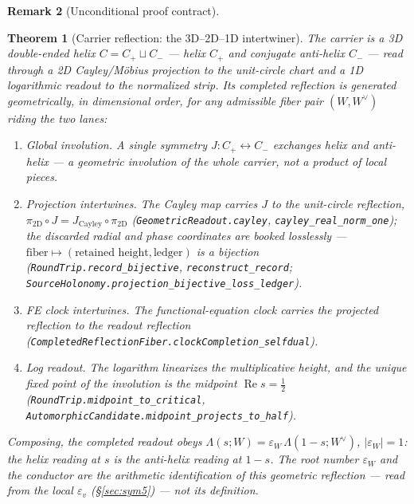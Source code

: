 \documentclass[11pt]{article}
\newtheorem{theorem}{Theorem}
\theoremstyle{definition}
\newtheorem{remark}[theorem]{Remark}
\renewcommand{\Re}{\operatorname{Re}}
\begin{document}
\begin{remark}[Unconditional proof contract]
\begin{enumerate}
\begin{theorem}[Carrier reflection: the 3D--2D--1D intertwiner]\label{thm:carrierreflection}
The carrier is a 3D double-ended helix $C=C_+\sqcup C_-$ --- helix $C_+$ and conjugate anti-helix $C_-$ ---
read through a 2D Cayley/M\"obius projection to the unit-circle chart and a 1D logarithmic readout to the
normalized strip. Its completed reflection is generated \emph{geometrically}, in dimensional order, for any
admissible fiber pair $(W,W^\vee)$ riding the two lanes:
\begin{enumerate}
\item[\textup{(J)}] \emph{Global involution.} A single symmetry $J\colon C_+\leftrightarrow C_-$ exchanges helix
and anti-helix --- a geometric involution of the \emph{whole} carrier, not a product of local pieces.
\item[\textup{(P)}] \emph{Projection intertwines.} The Cayley map carries $J$ to the unit-circle reflection,
$\pi_{2\mathrm D}\!\circ J=J_{\mathrm{Cayley}}\!\circ\pi_{2\mathrm D}$ (\texttt{GeometricReadout.cayley},
\texttt{cayley\_real\_norm\_one}); the discarded radial and phase coordinates are booked \emph{losslessly} ---
$\text{fiber}\mapsto(\text{retained height},\text{ledger})$ is a bijection
(\texttt{RoundTrip.record\_bijective}, \texttt{reconstruct\_record};
\texttt{SourceHolonomy.projection\_bijective\_loss\_ledger}).
\item[\textup{(C)}] \emph{FE clock intertwines.} The functional-equation clock carries the projected reflection
to the readout reflection (\texttt{CompletedReflectionFiber.clockCompletion\_selfdual}).
\item[\textup{(L)}] \emph{Log readout.} The logarithm linearizes the multiplicative height, and the unique
fixed point of the involution is the midpoint $\Re s=\tfrac12$ (\texttt{RoundTrip.midpoint\_to\_critical},
\texttt{AutomorphicCandidate.midpoint\_projects\_to\_half}).
\end{enumerate}
Composing, the completed readout obeys $\Lambda(s;W)=\varepsilon_W\,\Lambda(1-s;W^\vee)$, $|\varepsilon_W|=1$:
the helix reading at $s$ is the anti-helix reading at $1-s$. The root number $\varepsilon_W$ and the conductor
are the \emph{arithmetic identification} of this geometric reflection --- read from the local $\varepsilon_v$
(\S\ref{sec:sym5}) --- not its definition.
\end{theorem}


\end{enumerate}
\end{remark}
\end{document}
